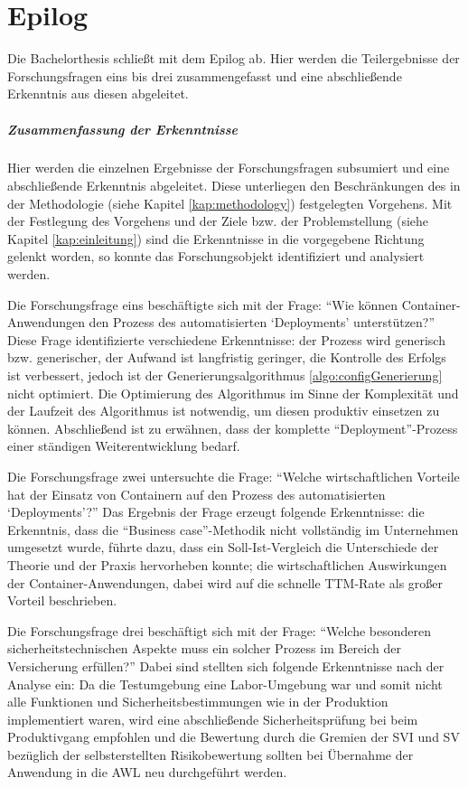 \chapter{Epilog} \label{kritischeBetrachtung}
Die Bachelorthesis schließt mit dem Epilog ab. Hier werden die Teilergebnisse der Forschungsfragen eins bis drei zusammengefasst und eine abschließende Erkenntnis aus diesen abgeleitet. 
\paragraph{Zusammenfassung der Erkenntnisse}
Hier werden die einzelnen Ergebnisse der Forschungsfragen subsumiert und eine abschließende Erkenntnis abgeleitet. Diese unterliegen den Beschränkungen des in der Methodologie (siehe Kapitel \vref{kap:methodology}) festgelegten Vorgehens. Mit der Festlegung des Vorgehens und der Ziele bzw. der Problemstellung (siehe Kapitel \vref{kap:einleitung}) sind die Erkenntnisse in die vorgegebene Richtung gelenkt worden, so konnte das Forschungsobjekt identifiziert und analysiert werden.
\par
Die Forschungsfrage eins beschäftigte sich mit der Frage: \enquote{Wie können Container-Anwendungen den Prozess des automatisierten \enquote{Deployments} unterstützen?} Diese Frage identifizierte verschiedene Erkenntnisse: der Prozess wird generisch bzw. generischer, der Aufwand ist langfristig geringer, die Kontrolle des Erfolgs ist verbessert, jedoch ist der Generierungsalgorithmus \vref{algo:configGenerierung} nicht optimiert. Die Optimierung des Algorithmus im Sinne der Komplexität und der Laufzeit des Algorithmus ist notwendig, um diesen produktiv einsetzen zu können. Abschließend ist zu erwähnen, dass der komplette \enquote{Deployment}-Prozess einer ständigen Weiterentwicklung bedarf.
\par
Die Forschungsfrage zwei untersuchte die Frage: \enquote{Welche wirtschaftlichen Vorteile hat der Einsatz von Containern auf den Prozess des automatisierten \enquote{Deployments}?} Das Ergebnis der Frage erzeugt folgende Erkenntnisse: die Erkenntnis, dass die \enquote{Business case}-Methodik nicht vollständig im Unternehmen umgesetzt wurde, führte dazu, dass ein Soll-Ist-Vergleich die Unterschiede der Theorie und der Praxis hervorheben konnte; die wirtschaftlichen Auswirkungen der Container-Anwendungen, dabei wird auf die schnelle \ac{TTM}-Rate als großer Vorteil beschrieben.
\par
Die Forschungsfrage drei beschäftigt sich mit der Frage: \enquote{Welche besonderen sicherheitstechnischen Aspekte muss ein solcher Prozess im Bereich der Versicherung erfüllen?} Dabei sind stellten sich folgende Erkenntnisse nach der Analyse ein: Da die Testumgebung eine Labor-Umgebung war und somit nicht alle Funktionen und Sicherheitsbestimmungen wie in der Produktion implementiert waren, wird eine abschließende Sicherheitsprüfung bei beim Produktivgang empfohlen und die Bewertung durch die Gremien der \ac{SVI} und \ac{SV} bezüglich der selbsterstellten Risikobewertung sollten bei Übernahme der Anwendung in die \ac{AWL} neu durchgeführt werden.

